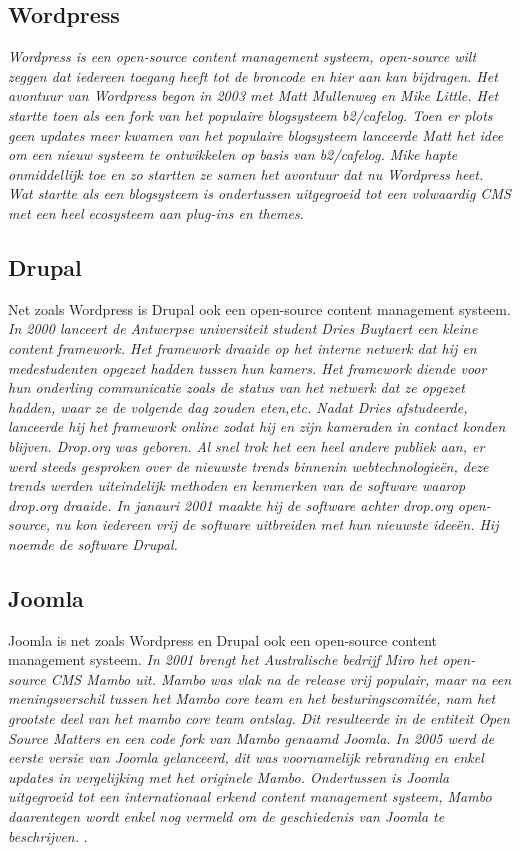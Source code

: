 \subsection{Wordpress}
\textit{Wordpress is een open-source content management systeem, open-source wilt zeggen dat iedereen toegang heeft tot de broncode en hier aan kan bijdragen. Het avontuur van Wordpress begon in 2003 met Matt Mullenweg en Mike Little. Het startte toen als een fork van het populaire blogsysteem b2/cafelog. Toen er plots geen updates meer kwamen van het populaire blogsysteem lanceerde Matt het idee om een nieuw systeem te ontwikkelen op basis van b2/cafelog. Mike hapte onmiddellijk toe en zo startten ze samen het avontuur dat nu Wordpress heet. Wat startte als een blogsysteem is ondertussen uitgegroeid tot een volwaardig CMS met een heel ecosysteem aan plug-ins en themes}.\autocite{Postma2018}

\subsection{Drupal}
Net zoals Wordpress is Drupal ook een open-source content management systeem. \textit{In 2000 lanceert de Antwerpse universiteit student Dries Buytaert een kleine content framework. Het framework draaide op het interne netwerk dat hij en medestudenten opgezet hadden tussen hun kamers. Het framework diende voor hun onderling communicatie zoals de status van het netwerk dat ze opgezet hadden, waar ze de volgende dag zouden eten,etc. Nadat Dries afstudeerde, lanceerde hij het framework online zodat hij en zijn kameraden in contact konden blijven. Drop.org was geboren. Al snel trok het een heel andere publiek aan, er werd steeds gesproken over de nieuwste trends binnenin webtechnologieën, deze trends werden uiteindelijk methoden en kenmerken van de software waarop drop.org draaide. In janauri 2001 maakte hij de software achter drop.org open-source, nu kon iedereen vrij de software uitbreiden met hun nieuwste ideeën. Hij noemde de software Drupal.}\autocite{Drupal2018}

\subsection{Joomla}
Joomla is net zoals Wordpress en Drupal ook een open-source content management systeem. \textit{In 2001 brengt het Australische bedrijf Miro het open-source CMS Mambo uit. Mambo was vlak na de release vrij populair, maar na een meningsverschil tussen het Mambo core team en het besturingscomitée, nam het grootste deel van het mambo core team ontslag. Dit resulteerde in de entiteit Open Source Matters en een code fork van Mambo genaamd Joomla. In 2005 werd de eerste versie van Joomla gelanceerd, dit was voornamelijk rebranding en enkel updates in vergelijking met het originele Mambo. Ondertussen is Joomla uitgegroeid tot een internationaal erkend content management systeem, Mambo daarentegen wordt enkel nog vermeld om de geschiedenis van Joomla te beschrijven.}\autocite{Crowder2009} .